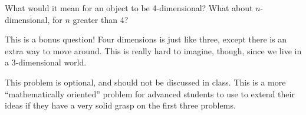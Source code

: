 \documentclass{ximera}
\begin{document}
\begin{problem}
    What would it mean for an object to be 4-dimensional?  What about $n$-dimensional, for $n$ greater than 4?
    
    \begin{solution}
        This is a bonus question!  Four dimensions is just like three, except there is an extra way to move around.  This is really hard to imagine, though, since we live in a 3-dimensional world.
    \end{solution}
    
    \begin{instructorNotes}
        This problem is optional, and should not be discussed in class.  This is a more ``mathematically oriented'' problem for advanced students to use to extend their ideas if they have a very solid grasp on the first three problems.
    \end{instructorNotes}
\end{problem}
\end{document}
